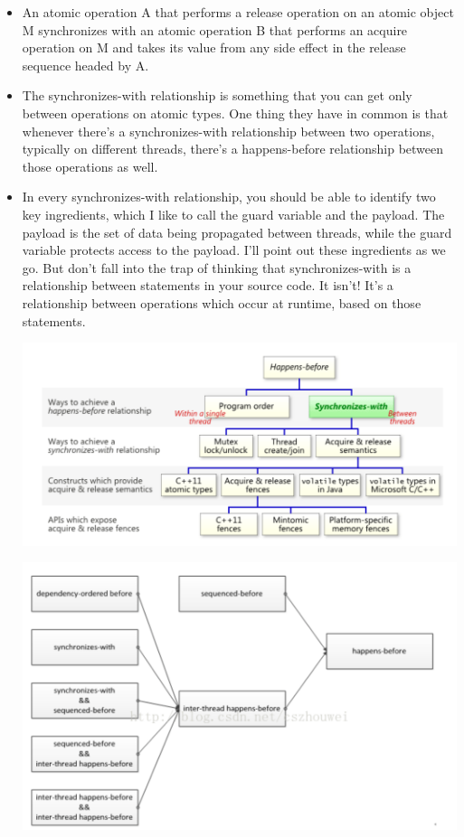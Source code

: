 \documentclass[a4paper,11pt,twoside]{book}
\begin{document}
\begin{itemize}
		\item An atomic operation A that performs a release operation on an atomic object M synchronizes with an atomic operation B that performs an acquire operation on M and takes its value from any side effect in the release sequence headed by A.

		\item The synchronizes-with relationship is something that you can get only between operations on atomic types. One thing they have in common is that whenever there’s a synchronizes-with relationship between two operations, typically on different threads, there’s a happens-before relationship between those operations as well.

		\item In every synchronizes-with relationship, you should be able to identify two key ingredients, which I like to call the guard variable and the payload. The payload is the set of data being propagated between threads, while the guard variable protects access to the payload. I’ll point out these ingredients as we go. But don’t fall into the trap of thinking that synchronizes-with is a relationship between statements in your source code. It isn’t! It’s a relationship between operations which occur at runtime, based on those statements.


\begin{center}
	\includegraphics[width=0.85\linewidth]{pics/happen_before.png}
\end{center}

\begin{center}
	\includegraphics[width=0.85\linewidth]{pics/happen1.png}
\end{center}


\end{itemize}
\end{document}
